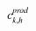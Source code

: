 

    \[\let\par\empty

    
{{{{\miitalic{c}}}\sb{{{\miitalic{k}}{\miitalic{,}}{\miitalic{h}}}}\sp{{\miitalic{prod}}}}}


    \]

  